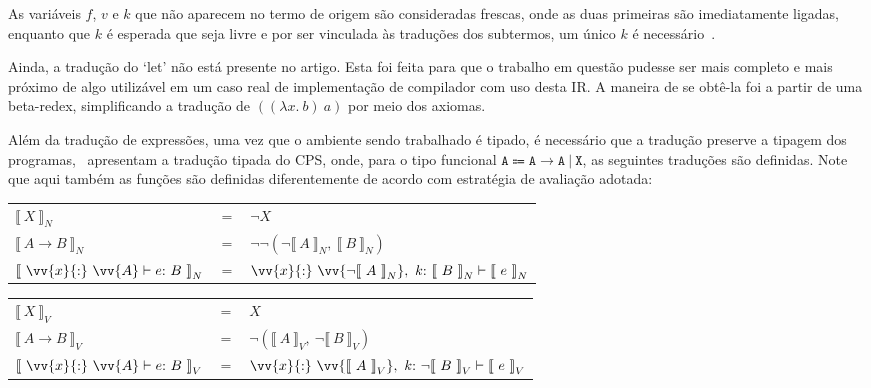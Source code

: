 \phantom{Newline}

\noindent As variáveis $f$, $v$ e $k$ que não aparecem no termo de origem são consideradas frescas, onde as duas primeiras são imediatamente ligadas, enquanto que $k$ é esperada que seja livre e por ser vinculada às traduções dos subtermos, um único $k$ é necessário~\cite{torrens2024operational}.

Ainda, a tradução do `let' não está presente no artigo.
Esta foi feita para que o trabalho em questão pudesse ser mais completo e mais próximo de algo utilizável em um caso real de implementação de compilador com uso desta IR.
A maneira de se obtê-la foi a partir de uma beta-redex, simplificando a tradução de $((\lambda x.\ b)\ a)$ por meio dos axiomas.

Além da tradução de expressões, uma vez que o ambiente sendo trabalhado é tipado, é necessário que a tradução preserve a tipagem dos programas,~ apresentam a tradução tipada do CPS, onde, para o tipo funcional $\mathtt{A \Coloneqq A \to A\ |\ X}$, as seguintes traduções são definidas.
Note que aqui também as funções são definidas diferentemente de acordo com estratégia de avaliação adotada:

\phantom{Newline}

\begin{tabular}{lcl}
     ${\llbracket\ X\ \rrbracket}_N$ & $=$ & $\neg X$ \\ 
     ${\llbracket\ A \rightarrow B\ \rrbracket}_N$ & $=$ & $\neg\neg(\neg{\llbracket\ A\ \rrbracket}_N,\ {\llbracket\ B\ \rrbracket}_N)$ \\ 
     ${\llbracket\ \vv{x}{:}\ \vv{A} \vdash e{:}\ B\ \rrbracket}_N$ & $=$ & $\vv{x}{:}\ \vv{\neg{\llbracket\ A\ \rrbracket}_N},\ k{:}\ {\llbracket\ B\ \rrbracket}_N \vdash {\llbracket\ e\ \rrbracket}_N$ \\ 
\end{tabular}

\phantom{Newline}

\begin{tabular}{lcl}
     ${\llbracket\ X\ \rrbracket}_V$ & $=$ & $X$ \\ 
     ${\llbracket\ A \rightarrow B\ \rrbracket}_V$ & $=$ & $\neg({\llbracket\ A\ \rrbracket}_V,\ \neg{\llbracket\ B\ \rrbracket}_V)$ \\ 
     ${\llbracket\ \vv{x}{:}\ \vv{A} \vdash e{:}\ B\ \rrbracket}_V$ & $=$ & $\vv{x}{:}\ \vv{{\llbracket\ A\ \rrbracket}_V},\ k{:}\ \neg{\llbracket\ B\ \rrbracket}_V \vdash {\llbracket\ e\ \rrbracket}_V$ \\ 
\end{tabular}

